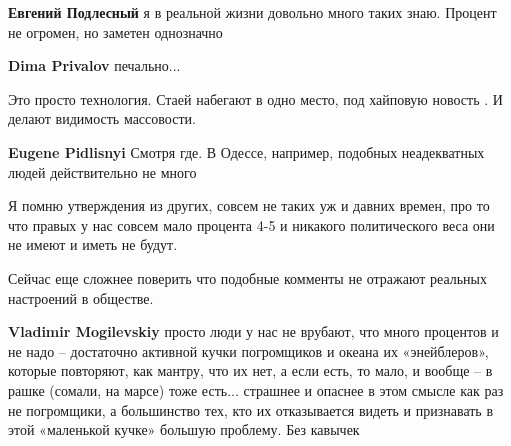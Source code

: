 \begin{itemize}
\begin{itemize}
\textbf{Евгений Подлесный} я в реальной жизни довольно много таких знаю. Процент не огромен, но заметен однозначно

 
\textbf{Dima Privalov} печально...

 
Это просто технология. Стаей набегают в одно место, под хайповую новость . И делают видимость массовости.

 
\textbf{Eugene Pidlisnyi} Смотря где. В Одессе, например, подобных неадекватных людей действительно не много

 

Я помню утверждения из других, совсем не таких уж и давних времен, про то что
правых у нас совсем мало процента 4-5 и никакого политического веса они не
имеют и иметь не будут.

Сейчас еще сложнее поверить что подобные комменты не отражают реальных
настроений в обществе.

 
\textbf{Vladimir Mogilevskiy} просто люди у нас не врубают, что много процентов
и не надо – достаточно активной кучки погромщиков и океана их «энейблеров»,
которые повторяют, как мантру, что их нет, а если есть, то мало, и вообще – в
рашке (сомали, на марсе) тоже есть... страшнее и опаснее в этом смысле как раз не
погромщики, а большинство тех, кто их отказывается видеть и признавать в этой
«маленькой кучке» большую проблему. Без кавычек


\end{itemize}
\end{itemize}
